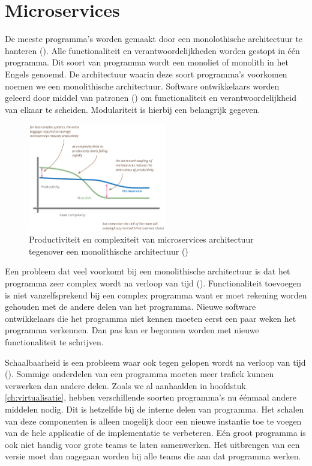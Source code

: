 \documentclass[pdftex,a4paper,12pt,twoside]{report}
\begin{document}
\chapter{Microservices}
\label{ch:microservices}

De meeste programma's worden gemaakt door een monolothische architectuur te hanteren (\cite{villamizar_evaluating_2015}). Alle functionaliteit en verantwoordelijkheden worden gestopt in één programma. Dit soort van programma wordt een monoliet of monolith in het Engels genoemd. De architectuur waarin deze soort programma's voorkomen noemen we een monolithische architectuur. Software ontwikkelaars worden geleerd door middel van patronen (\cite{tichy_catalogue_1997}) om functionaliteit en verantwoordelijkheid van elkaar te scheiden. Modulariteit is hierbij een belangrijk gegeven.

\begin{figure}
    \centering
    \includegraphics[width=6cm]{img/microservices_monolith}
    \caption{Productiviteit en complexiteit van microservices architectuur tegenover een monolithische architectuur (\cite{martin_fowler_microservicepremium_2015})}
    \label{fig:pr}
\end{figure}

Een probleem dat veel voorkomt bij een monolithische architectuur is dat het programma zeer complex wordt na verloop van tijd (\cite{villamizar_evaluating_2015}). Functionaliteit toevoegen is niet vanzelfsprekend bij een complex programma want er moet rekening worden gehouden met de andere delen van het programma. Nieuwe software ontwikkelaars die het programma niet kennen moeten eerst een paar weken het programma verkennen. Dan pas kan er begonnen worden met nieuwe functionaliteit te schrijven.

Schaalbaarheid is een probleem waar ook tegen gelopen wordt na verloop van tijd (\cite{villamizar_evaluating_2015}). Sommige onderdelen van een programma moeten meer trafiek kunnen verwerken dan andere delen. Zoals we al aanhaalden in hoofdstuk \ref{ch:virtualisatie}, hebben verschillende soorten programma's nu éénmaal andere middelen nodig. Dit is hetzelfde bij de interne delen van programma. Het schalen van deze componenten is alleen mogelijk door een nieuwe instantie toe te voegen van de hele applicatie of de implementatie te verbeteren. Eén groot programma is ook niet handig voor grote teams te laten samenwerken. Het uitbrengen van een versie moet dan nagegaan worden bij alle teams die aan dat programma werken.
\end{document}
